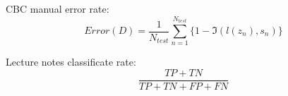
CBC manual error rate:
\[
Error(D) = \frac{1}{N_{test}} \sum_{n=1}^{N_{test}} \{ 1 - \Im(l(z_n),s_n) \}
\]

Lecture notes classificate rate:
\[
\frac{TP+TN }{TP+TN+FP+FN}
\]


